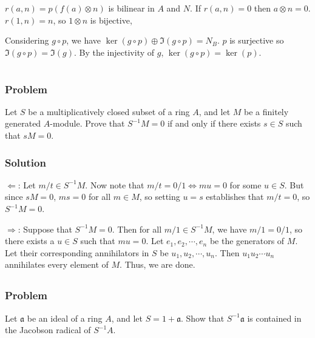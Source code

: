 \documentclass[book,12pt,oneside,openany]{memoir}
\begin{document}
$r(a,n)=p(f(a)\otimes n)$ is bilinear in $A$ and $N$.
If $r(a,n)=0$ then $a\otimes n=0$.
$r(1,n)=n$, so $1\otimes n$ is bijective,

Considering $g\circ p$, we have $\ker(g\circ p)\oplus \Im(g\circ p)=N_B$.
$p$ is surjective so $\Im(g\circ p)=\Im(g)$.
By the injectivity of $g$, $\ker(g\circ p)=\ker(p)$.

\chapter{}

\section{}
\subsection{Problem}
Let $S$ be a multiplicatively closed subset of a ring $A$, and let $M$ be a finitely generated $A$-module. Prove that $S^{-1}M = 0$ if and only if there exists $s \in S$ such that $sM = 0$.

\subsection{Solution}
$\Leftarrow$: Let $m/t \in S^{-1}M$. Now note that $m/t  = 0/1 \Leftrightarrow mu = 0$ for some $u \in S$. But since $sM = 0$, $ms = 0$ for all $m \in M$, so setting $u = s$ establishes that $m/t = 0$, so $S^{-1}M = 0$.

$\Rightarrow$: Suppose that $S^{-1}M = 0$. Then for all $m/1 \in S^{-1}M$, we have $m/1 = 0/1$, so there exists a $u \in S$ such that $mu = 0$. Let $e_1, e_2, \cdots, e_n$ be the generators of $M$. Let their corresponding annihilators in $S$ be $u_1, u_2, \cdots, u_n$. Then $u_1 u_2 \cdots u_n$ annihilates every element of $M$. Thus, we are done.

\section{}
\subsection{Problem}
Let $\mathfrak{a}$ be an ideal of a ring $A$, and let $S = 1 + \mathfrak{a}$. Show that $S^{-1}\mathfrak{a}$ is contained in the Jacobson radical of $S^{-1}A$. 
\end{document}
